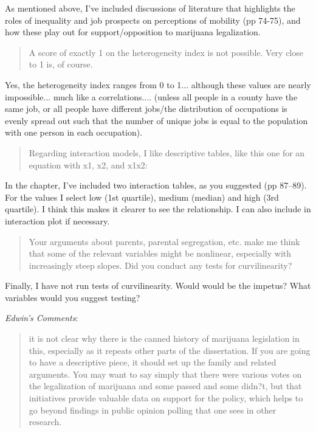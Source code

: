 \documentclass[12pt,stdletter,dateno,sigleft]{newlfm} %
\begin{document}
\begin{newlfm}
As mentioned above, I've included discussions of literature that highlights the roles of inequality and job prospects on perceptions of mobility (pp 74-75), and how these play out for support/opposition to marijuana legalization. 


\begin{quotation}{\color{red}\noindent \footnotesize
A score of exactly 1 on the heterogeneity index is not possible. Very close to 1 is, of course.
}
\end{quotation}


Yes, the heterogeneity index ranges from 0 to 1...  although these values are nearly impossible... much like a correlations.... (unless all people in a county have the same job, or all people have different jobs/the distribution of occupations is evenly spread out such that the number of unique jobs is equal to the population with one person in each occupation). 



\begin{quotation}{\color{red}\noindent \footnotesize
Regarding interaction models, I like descriptive tables, like this one for an equation with x1, x2, and x1x2:
}
\end{quotation}


In the chapter, I've included two interaction tables, as you suggested (pp 87--89). For the values I select low (1st quartile), medium (median) and high (3rd quartile). I think this makes it clearer to see the relationship. I can also include in interaction plot if necessary.


\begin{quotation}{\color{red}\noindent \footnotesize
Your arguments about parents, parental segregation, etc. make me think that some of the relevant variables might be nonlinear, especially with increasingly steep slopes. Did you conduct any tests for curvilinearity?
}
\end{quotation}

Finally, I have not run tests of curvilinearity. Would would be the impetus? What variables would you suggest testing? \newline


\textit{Edwin's Comments}:

\begin{quotation}{\color{red}\noindent \footnotesize
it is not clear why there is the canned history of marijuana legislation in this, especially as it repeats other parts of the dissertation. If you are going to have a descriptive piece, it should set up the family and related arguments.  You may want to say simply that there were various votes on the legalization of marijuana and some passed and some didn?t, but that initiatives provide valuable data on support for the policy, which helps to go beyond findings in public opinion polling that one sees in other research.
}
\end{quotation}



\end{newlfm}
\end{document}
